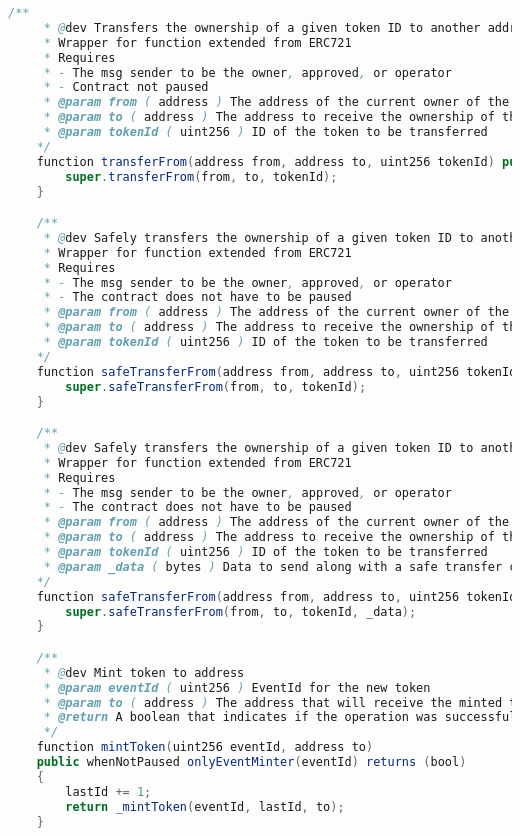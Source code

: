 \documentclass[MSE,Master,english]{twbook}%
\begin{document}
\begin{lstlisting}[language=Java, name={POAP Smart Contract}, label={sc:poapContract}]
    /**
     * @dev Transfers the ownership of a given token ID to another address
     * Wrapper for function extended from ERC721
     * Requires 
     * - The msg sender to be the owner, approved, or operator
     * - Contract not paused
     * @param from ( address ) The address of the current owner of the token
     * @param to ( address ) The address to receive the ownership of the given token ID
     * @param tokenId ( uint256 ) ID of the token to be transferred
    */
    function transferFrom(address from, address to, uint256 tokenId) public whenNotPaused {
        super.transferFrom(from, to, tokenId);
    }

    /**
     * @dev Safely transfers the ownership of a given token ID to another address (Implements ERC71)
     * Wrapper for function extended from ERC721
     * Requires 
     * - The msg sender to be the owner, approved, or operator
     * - The contract does not have to be paused
     * @param from ( address ) The address of the current owner of the token
     * @param to ( address ) The address to receive the ownership of the given token ID
     * @param tokenId ( uint256 ) ID of the token to be transferred
    */
    function safeTransferFrom(address from, address to, uint256 tokenId) public whenNotPaused {
        super.safeTransferFrom(from, to, tokenId);
    }

    /**
     * @dev Safely transfers the ownership of a given token ID to another address (Implements ERC71)
     * Wrapper for function extended from ERC721 
     * Requires 
     * - The msg sender to be the owner, approved, or operator
     * - The contract does not have to be paused
     * @param from ( address ) The address of the current owner of the token
     * @param to ( address ) The address to receive the ownership of the given token ID
     * @param tokenId ( uint256 ) ID of the token to be transferred
     * @param _data ( bytes ) Data to send along with a safe transfer check
    */
    function safeTransferFrom(address from, address to, uint256 tokenId, bytes memory _data) public whenNotPaused {
        super.safeTransferFrom(from, to, tokenId, _data);
    }

    /**
     * @dev Mint token to address
     * @param eventId ( uint256 ) EventId for the new token
     * @param to ( address ) The address that will receive the minted tokens.
     * @return A boolean that indicates if the operation was successful.
     */
    function mintToken(uint256 eventId, address to)
    public whenNotPaused onlyEventMinter(eventId) returns (bool)
    {
        lastId += 1;
        return _mintToken(eventId, lastId, to);
    }


\end{lstlisting}
\end{document}
